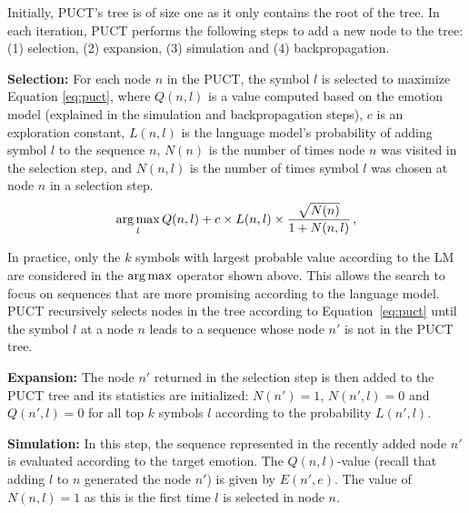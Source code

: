 Initially, PUCT's tree is of size one as it only contains the root of the tree. In each iteration, PUCT performs the following steps to add a new node to the tree: (1) selection, (2) expansion, (3) simulation and (4) backpropagation.

\vspace{0.1in}
\noindent
\textbf{Selection:} For each node $n$ in the PUCT, the symbol $l$ is selected to maximize Equation \ref{eq:puct},
where $Q(n, l)$ is a value computed based on the emotion model (explained in the simulation and backpropagation steps), $c$ is an exploration constant, $L(n, l)$ is the language model's probability of adding symbol $l$ to the sequence $n$, $N(n)$ is the number of times node $n$ was visited in the selection step, and $N(n, l)$ is the number of times symbol $l$ was chosen at node $n$ in a selection step.
\begin{equation}
\operatorname*{arg\,max}_{l} Q(n, l) + c \times L(n, l) \times \frac{\sqrt{N(n)}}{1 + N(n, l)} \,,
\label{eq:puct}
\end{equation}
\noindent

 In practice, only the $k$ symbols with largest probable value according to the LM are considered in the $\operatorname*{arg\,max}$ operator shown above. This allows the search to focus on sequences that are more promising according to the language model. PUCT recursively selects nodes in the tree according to Equation~\ref{eq:puct} until the symbol $l$ at a node $n$ leads to a sequence whose node $n'$ is not in the PUCT tree.

\vspace{0.1in}
\noindent
\textbf{Expansion:} The node $n'$ returned in the selection step is then added to the PUCT tree and its statistics are initialized: $N(n') = 1$, $N(n', l) = 0$ and $Q(n', l) = 0$ for all top $k$ symbols $l$ according to the probability $L(n', l)$.

\vspace{0.1in}
\noindent
\textbf{Simulation:} In this step, the sequence represented in the recently added node $n'$ is evaluated according to the target emotion. The $Q(n, l)$-value (recall that adding $l$ to $n$ generated the node $n'$) is given by $E(n', e)$. The value of $N(n, l) = 1$ as this is the first time $l$ is selected in node $n$.

